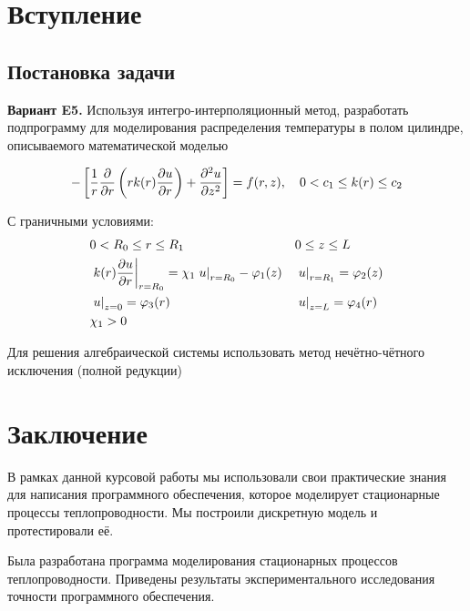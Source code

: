 \documentclass[a4paper,12pt]{article}
\begin{document}
\newcommand\mLim[4]{
  \int\limits^{r_{i #1}}_{r_{i #2}}
  \int\limits^{z_{j #3}}_{z_{j #4}}
}

\newcommand\Int[2]{
  \int\limits^{#1}_{#2}
}

\newcommand\mLimS[3]
{
  \int\limits^{#1_{i#2}}_{#1_{i#3}}
}

\newcommand\mLimZ[4]
{
  \int\limits^{#1_{#4 #2}}_{#1_{#4 #3}}
}


  \tableofcontents
  \newpage
  \section{Вступление}
  \subsection{Постановка задачи}

  \textbf{Вариант E5.} Используя интегро-интерполяционный метод, разработать подпрограмму для моделирования распределения температуры в полом цилиндре, описываемого математической моделью

  \begin{equation}\label{eq1}
    - \left [ \frac{1}{r} \pdv{}{r} \left ( r k(r) \pdv{u}{r} \right ) 
    + \pdv[2]{u}{z} \right ] = f(r, z), \quad 0 < c_1 \le k(r) \le c_2
  \end{equation}

  С граничными условиями:
  \begin{align*}
    & 0 < R_0 \le r \leq R_1 &
    & 0 \leq z \leq L \\
    & \left . k(r) \pdv{u}{r} \right \vert_{r=R_0} = \chi_1 \left . u \right \vert_{r=R_0} - \varphi_1(z) &
    & \left . u \right \vert_{r=R_1} = \varphi_2(z) \\
    & \left . u \right \vert_{z=0} = \varphi_3(r) &
    & \left . u \right \vert_{z=L} = \varphi_4(r) \\
    & \chi_1 > 0 &
  \end{align*}
  
  Для решения алгебраической системы использовать метод нечётно-чётного исключения (полной редукции)

  \newpage
  

  \newpage
  

  \newpage
  

  \newpage
  

  \newpage
  

  \newpage
  \section{Заключение}

  В рамках данной курсовой работы мы использовали свои практические знания для написания программного обеспечения, которое моделирует стационарные процессы теплопроводности. Мы построили дискретную модель и протестировали её.

  Была разработана программа моделирования стационарных процессов теплопроводности. Приведены результаты экспериментального исследования точности программного обеспечения.

  \newpage
  
\end{document}
